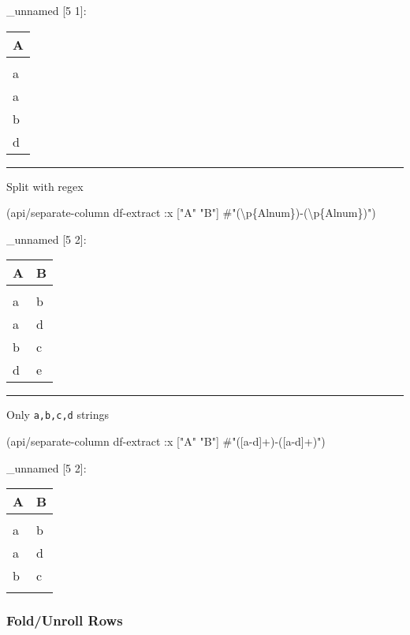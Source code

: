 \documentclass[]{article}
\newenvironment{Shaded}{\begin{snugshade}}{\end{snugshade}}
\newcommand{\StringTok}[1]{\textcolor[rgb]{0.31,0.60,0.02}{#1}}
\newcommand{\SpecialStringTok}[1]{\textcolor[rgb]{0.31,0.60,0.02}{#1}}
\newcommand{\AttributeTok}[1]{\textcolor[rgb]{0.77,0.63,0.00}{#1}}
\newcommand{\NormalTok}[1]{#1}
\begin{document}
\_unnamed {[}5 1{]}:

\begin{longtable}[]{@{}l@{}}
\toprule
A\tabularnewline
\midrule
\endhead
\tabularnewline
a\tabularnewline
a\tabularnewline
b\tabularnewline
d\tabularnewline
\bottomrule
\end{longtable}

\begin{center}\rule{0.5\linewidth}{0.5pt}\end{center}

Split with regex

\begin{Shaded}
\begin{Highlighting}[]
\NormalTok{(api/separate-column df-extract }\AttributeTok{:x}\NormalTok{ [}\StringTok{"A"} \StringTok{"B"}\NormalTok{] }\SpecialStringTok{#"(\textbackslash{}p\{Alnum\})-(\textbackslash{}p\{Alnum\})"}\NormalTok{)}
\end{Highlighting}
\end{Shaded}

\_unnamed {[}5 2{]}:

\begin{longtable}[]{@{}ll@{}}
\toprule
A & B\tabularnewline
\midrule
\endhead
&\tabularnewline
a & b\tabularnewline
a & d\tabularnewline
b & c\tabularnewline
d & e\tabularnewline
\bottomrule
\end{longtable}

\begin{center}\rule{0.5\linewidth}{0.5pt}\end{center}

Only \texttt{a,b,c,d} strings

\begin{Shaded}
\begin{Highlighting}[]
\NormalTok{(api/separate-column df-extract }\AttributeTok{:x}\NormalTok{ [}\StringTok{"A"} \StringTok{"B"}\NormalTok{] }\SpecialStringTok{#"([a-d]+)-([a-d]+)"}\NormalTok{)}
\end{Highlighting}
\end{Shaded}

\_unnamed {[}5 2{]}:

\begin{longtable}[]{@{}ll@{}}
\toprule
A & B\tabularnewline
\midrule
\endhead
&\tabularnewline
a & b\tabularnewline
a & d\tabularnewline
b & c\tabularnewline
&\tabularnewline
\bottomrule
\end{longtable}

\subsubsection{Fold/Unroll Rows}\label{foldunroll-rows}
\end{document}
